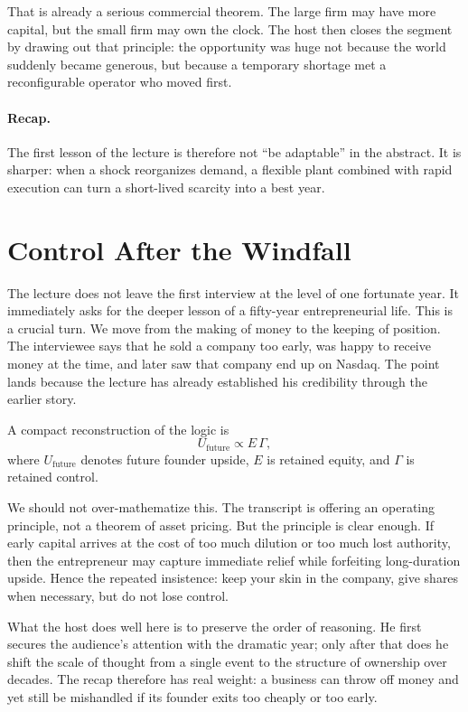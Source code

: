 That is already a serious commercial theorem. The large firm may have more capital, but the small firm may own the clock. The host then closes the segment by drawing out that principle: the opportunity was huge not because the world suddenly became generous, but because a temporary shortage met a reconfigurable operator who moved first.

\paragraph{Recap.} The first lesson of the lecture is therefore not ``be adaptable'' in the abstract. It is sharper: when a shock reorganizes demand, a flexible plant combined with rapid execution can turn a short-lived scarcity into a best year.

\section{Control After the Windfall}

The lecture does not leave the first interview at the level of one fortunate year. It immediately asks for the deeper lesson of a fifty-year entrepreneurial life. This is a crucial turn. We move from the making of money to the keeping of position. The interviewee says that he sold a company too early, was happy to receive money at the time, and later saw that company end up on Nasdaq. The point lands because the lecture has already established his credibility through the earlier story.

A compact reconstruction of the logic is
\begin{equation}
U_{\mathrm{future}} \propto E\,\Gamma,
\end{equation}
where \(U_{\mathrm{future}}\) denotes future founder upside, \(E\) is retained equity, and \(\Gamma\) is retained control.

We should not over-mathematize this. The transcript is offering an operating principle, not a theorem of asset pricing. But the principle is clear enough. If early capital arrives at the cost of too much dilution or too much lost authority, then the entrepreneur may capture immediate relief while forfeiting long-duration upside. Hence the repeated insistence: keep your skin in the company, give shares when necessary, but do not lose control.

What the host does well here is to preserve the order of reasoning. He first secures the audience's attention with the dramatic year; only after that does he shift the scale of thought from a single event to the structure of ownership over decades. The recap therefore has real weight: a business can throw off money and yet still be mishandled if its founder exits too cheaply or too early.

